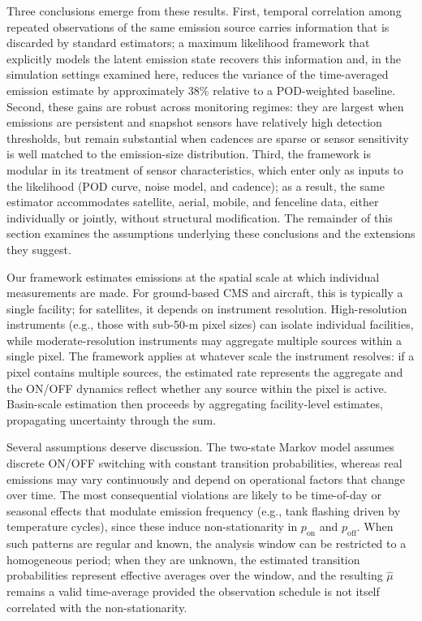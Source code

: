 \documentclass[unnumsec,webpdf,modern,mediumone]{oup-authoring-template}
\newcommand{\new}[1]{{\color{blue}#1}}
\newcommand{\edit}[1]{{\color{magenta}#1}}
\begin{document}
\new{Three conclusions emerge from these results. First, temporal correlation among repeated observations of the same emission source carries information that is discarded by standard estimators; a maximum likelihood framework that explicitly models the latent emission state recovers this information and, in the simulation settings examined here, reduces the variance of the time-averaged emission estimate by approximately 38\% relative to a POD-weighted baseline. Second, these gains are robust across monitoring regimes: they are largest when emissions are persistent and snapshot sensors have relatively high detection thresholds, but remain substantial when cadences are sparse or sensor sensitivity is well matched to the emission-size distribution. Third, the framework is modular in its treatment of sensor characteristics, which enter only as inputs to the likelihood (POD curve, noise model, and cadence); as a result, the same estimator accommodates satellite, aerial, mobile, and fenceline data, either individually or jointly, without structural modification. The remainder of this section examines the assumptions underlying these conclusions and the extensions they suggest.}

Our framework estimates emissions at the spatial scale at which individual measurements are made. For ground-based CMS and aircraft, this is typically a single facility; for satellites, it depends on instrument resolution. \edit{High-resolution instruments (e.g., those with sub-50-m pixel sizes)} can isolate individual facilities, while moderate-resolution instruments may aggregate multiple sources within a single pixel. %
The framework applies at whatever scale the instrument resolves: if a pixel contains multiple sources, the estimated rate represents the aggregate and the ON/OFF dynamics reflect whether any source within the pixel is active. Basin-scale estimation then proceeds by aggregating facility-level estimates, propagating uncertainty through the sum.

Several assumptions deserve discussion. The two-state Markov model assumes discrete ON/OFF switching with constant transition probabilities, whereas real emissions may vary continuously and depend on operational factors that change over time. The most consequential violations are likely to be time-of-day or seasonal effects that modulate emission frequency (e.g., tank flashing driven by temperature cycles), since these induce non-stationarity in $p_{\text{on}}$ and $p_{\text{off}}$. When such patterns are regular and known, the analysis window can be restricted to a homogeneous period; when they are unknown, the estimated transition probabilities represent effective averages over the window, and the resulting $\hat{\mu}$ remains a valid time-average provided the observation schedule is not itself correlated with the non-stationarity.
\end{document}
